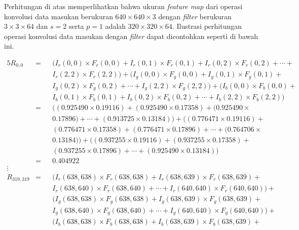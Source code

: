     Perhitungan di atas memperlihatkan bahwa ukuran \textit{feature map} dari operasi konvolusi data masukan berukuran $640\times 640\times 3$ dengan \textit{filter} berukuran $3\times 3\times 64$ dan $s=2$ serta $p=1$ adalah $320\times 320\times 64$. Ilustrasi perhitungan operasi konvolusi data masukan dengan \textit{filter} dapat dicontohkan seperti di bawah ini.

    \begin{alignat*}{5}
        R_{0, 0} &= &&\bigl( I_{r}(0, 0)\times F_{r}(0, 0) + I_{r}(0, 1)\times F_{r}(0, 1) + I_{r}(0, 2)\times F_{r}(0, 2) + \cdots + \\
        & &&I_{r}(2, 2)\times F_{r}(2, 2) \bigr) + \bigl( I_{g}(0, 0)\times F_{g}(0, 0) + I_{g}(0, 1)\times F_{g}(0, 1) + \\
        & &&I_{g}(0, 2)\times F_{g}(0, 2) + \cdots + I_{g}(2, 2)\times F_{g}(2, 2) \bigr) + \bigl( I_{b}(0, 0)\times F_{b}(0, 0) + \\
        & &&I_{b}(0, 1)\times F_{b}(0, 1) + I_{b}(0, 2)\times F_{b}(0, 2) + \cdots + I_{b}(2, 2)\times F_{b}(2, 2) \bigr) \\
        &= &&\bigl( (0.925490\times 0.19116) + (0.925490\times 0.17358) + (0.925490\times \\
        & &&0.17896) + \cdots + (0.913725\times 0.13184) \bigr) + \bigl( (0.776471\times 0.19116) + \\
        & &&(0.776471\times 0.17358) + (0.776471\times 0.17896) + \cdots + (0.764706\times \\
        & &&0.13184) \bigr) + \bigl( (0.937255\times 0.19116) + (0.937255\times 0.17358) + \\
        & &&(0.937255\times 0.17896) + \cdots + (0.925490\times 0.13184) \bigr) \\
        &= &&0.404922 \\
        \vdots \\
        R_{319, 319} &= &&\bigl( I_{r}(638, 638)\times F_{r}(638, 638) + I_{r}(638, 639)\times F_{r}(638, 639) + \\
        & &&I_{r}(638, 640)\times F_{r}(638, 640) + \cdots + I_{r}(640, 640)\times F_{r}(640, 640) \bigr) + \\
        & &&\bigl( I_{g}(638, 638)\times F_{g}(638, 638) + I_{g}(638, 639)\times F_{g}(638, 639) + \\
        & &&I_{g}(638, 640)\times F_{g}(638, 640) + \cdots + I_{g}(640, 640)\times F_{g}(640, 640) \bigr) + \\
        & &&\bigl( I_{b}(638, 638)\times F_{b}(638, 638) + I_{b}(638, 639)\times F_{b}(638, 639) + \\

\end{alignat*}
